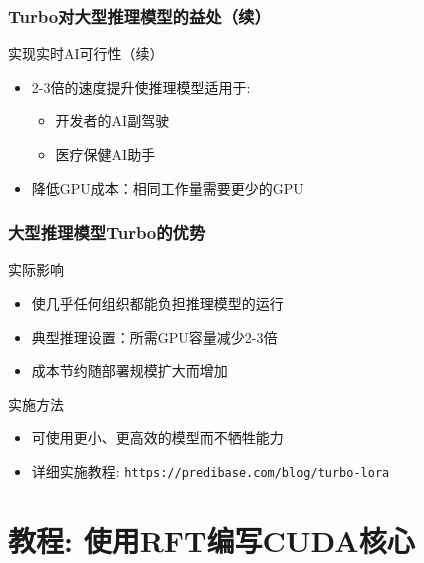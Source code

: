 \documentclass[aspectratio=169]{beamer}
\begin{document}
\begin{frame}[shrink=10]
	\frametitle{Turbo对大型推理模型的益处（续）}
	\begin{block}{实现实时AI可行性（续）}
		\begin{itemize}
			\item 2-3倍的速度提升使推理模型适用于:
			\begin{itemize}
				\item 开发者的AI副驾驶
				\item 医疗保健AI助手
			\end{itemize}
			\item 降低GPU成本：相同工作量需要更少的GPU
		\end{itemize}
	\end{block}
\end{frame}

\begin{frame}[shrink=10]
	\frametitle{大型推理模型Turbo的优势 }
	\begin{block}{实际影响}
		\begin{itemize}
			\item 使几乎任何组织都能负担推理模型的运行
			\item 典型推理设置：所需GPU容量减少2-3倍
			\item 成本节约随部署规模扩大而增加
		\end{itemize}
	\end{block}
	\begin{block}{实施方法}
		\begin{itemize}
			\item 可使用更小、更高效的模型而不牺牲能力
			\item 详细实施教程: \texttt{https://predibase.com/blog/turbo-lora}
		\end{itemize}
	\end{block}
\end{frame}

\section{教程: 使用RFT编写CUDA核心}
\end{document}
